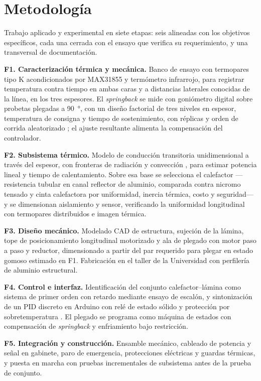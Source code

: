 \section{Metodología}

Trabajo aplicado y experimental en siete etapas: seis alineadas con los objetivos específicos, cada una cerrada con el ensayo que verifica su requerimiento, y una transversal de documentación.

\noindent\textbf{F1. Caracterización térmica y mecánica.} Banco de ensayo con termopares tipo K acondicionados por MAX31855 y termómetro infrarrojo, para registrar temperatura contra tiempo en ambas caras y a distancias laterales conocidas de la línea, en los tres espesores. El \emph{springback} se mide con goniómetro digital sobre probetas plegadas a \SI{90}{\degree}, con un diseño factorial de tres niveles en espesor, temperatura de consigna y tiempo de sostenimiento, con réplicas y orden de corrida aleatorizado \cite{montgomery2019}; el ajuste resultante alimenta la compensación del controlador.

\noindent\textbf{F2. Subsistema térmico.} Modelo de conducción transitoria unidimensional a través del espesor, con fronteras de radiación y convección \cite{incropera2011}, para estimar potencia lineal y tiempo de calentamiento. Sobre esa base se selecciona el calefactor —resistencia tubular en canal reflector de aluminio, comparada contra nicromo tensado y cinta calefactora por uniformidad, inercia térmica, costo y seguridad— y se dimensionan aislamiento y sensor, verificando la uniformidad longitudinal con termopares distribuidos e imagen térmica.

\noindent\textbf{F3. Diseño mecánico.} Modelado CAD de estructura, sujeción de la lámina, tope de posicionamiento longitudinal motorizado y ala de plegado con motor paso a paso y reductor, dimensionado a partir del par requerido para plegar en estado gomoso estimado en F1. Fabricación en el taller de la Universidad con perfilería de aluminio estructural.

\noindent\textbf{F4. Control e interfaz.} Identificación del conjunto calefactor--lámina como sistema de primer orden con retardo mediante ensayo de escalón, y sintonización de un PID discreto en Arduino con relé de estado sólido y protección por sobretemperatura \cite{astrom2006}. El plegado se programa como máquina de estados con compensación de \emph{springback} y enfriamiento bajo restricción.

\noindent\textbf{F5. Integración y construcción.} Ensamble mecánico, cableado de potencia y señal en gabinete, paro de emergencia, protecciones eléctricas y guardas térmicas, y puesta en marcha con pruebas incrementales de subsistema antes de la prueba de conjunto.

